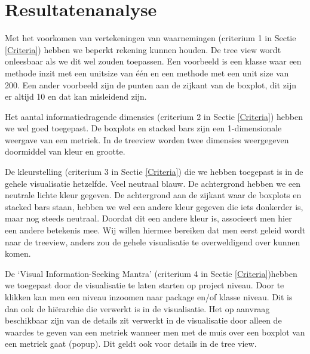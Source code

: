\documentclass[a4paper]{article}
\begin{document}
\section{Resultatenanalyse}
Met het voorkomen van vertekeningen van waarnemingen (criterium 1 in Sectie \ref{Criteria}) hebben we beperkt rekening kunnen houden. De tree view wordt onleesbaar als we dit wel zouden toepassen. Een voorbeeld is een klasse waar een methode inzit met een unitsize van één en een methode met een unit size van 200.
Een ander voorbeeld zijn de punten aan de zijkant van de boxplot, dit zijn er altijd 10 en dat kan misleidend zijn.

Het aantal informatiedragende dimensies (criterium 2 in Sectie \ref{Criteria}) hebben we wel goed toegepast. De boxplots en stacked bars zijn een 1-dimensionale weergave van een metriek. In de treeview worden twee dimensies weergegeven doormiddel van kleur en grootte. 

De kleurstelling (criterium 3 in Sectie \ref{Criteria}) die we hebben toegepast is in de gehele visualisatie hetzelfde. Veel neutraal blauw. De achtergrond hebben we een neutrale lichte kleur gegeven. De achtergrond aan de zijkant waar de boxplots en stacked bars staan, hebben we wel een andere kleur gegeven die iets donkerder is, maar nog steeds neutraal. Doordat dit een andere kleur is, associeert men hier een andere betekenis mee. Wij willen hiermee bereiken dat men eerst geleid wordt naar de treeview, anders zou de gehele visualisatie te overweldigend over kunnen komen.

De `Visual Information-Seeking Mantra' (criterium 4 in Sectie \ref{Criteria})hebben we toegepast door de visualisatie te laten starten op project niveau. Door te klikken kan men een niveau inzoomen naar package en/of klasse niveau. Dit is dan ook de hiërarchie die verwerkt is in de visualisatie. Het op aanvraag beschikbaar zijn van de details zit verwerkt in de visualisatie door alleen de waardes te geven van een metriek wanneer men met de muis over een boxplot van een metriek gaat (popup). Dit geldt ook voor details in de tree view.



\end{document}
